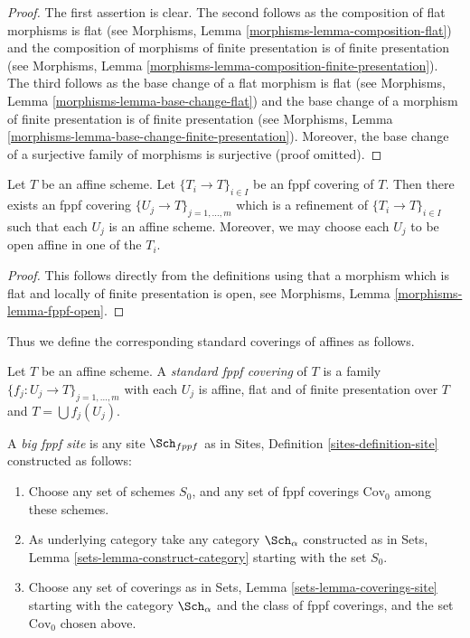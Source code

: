 \begin{proof}
The first assertion is clear.
The second follows as the composition of flat morphisms is flat
(see Morphisms, Lemma \ref{morphisms-lemma-composition-flat})
and the composition of morphisms of finite presentation is
of finite presentation
(see Morphisms, Lemma \ref{morphisms-lemma-composition-finite-presentation}).
The third follows as the base change of a flat morphism is flat
(see Morphisms, Lemma \ref{morphisms-lemma-base-change-flat})
and the base change of a morphism of finite presentation is
of finite presentation
(see Morphisms, Lemma \ref{morphisms-lemma-base-change-finite-presentation}).
Moreover, the base change of a surjective family of morphisms is surjective
(proof omitted).
\end{proof}

\begin{lemma}
\label{lemma-fppf-affine}
Let $T$ be an affine scheme.
Let $\{T_i \to T\}_{i \in I}$ be an fppf covering of $T$.
Then there exists an fppf covering
$\{U_j \to T\}_{j = 1, \ldots, m}$ which is a refinement
of $\{T_i \to T\}_{i \in I}$ such that each $U_j$ is an affine
scheme. Moreover, we may choose each $U_j$ to be open affine
in one of the $T_i$.
\end{lemma}

\begin{proof}
This follows directly from the definitions using that a
morphism which is flat and locally of finite presentation is open,
see Morphisms, Lemma \ref{morphisms-lemma-fppf-open}.
\end{proof}

\noindent
Thus we define the corresponding standard coverings of affines as follows.

\begin{definition}
\label{definition-standard-fppf}
Let $T$ be an affine scheme. A {\it standard fppf covering}
of $T$ is a family $\{f_j : U_j \to T\}_{j = 1, \ldots, m}$
with each $U_j$ is affine, flat and of finite presentation over $T$
and $T = \bigcup f_j(U_j)$.
\end{definition}

\begin{definition}
\label{definition-big-fppf-site}
A {\it big fppf site} is any site $\Sch_{fppf}$ as in
Sites, Definition \ref{sites-definition-site} constructed as follows:
\begin{enumerate}
\item Choose any set of schemes $S_0$, and any set of fppf coverings
$\text{Cov}_0$ among these schemes.
\item As underlying category take any category $\Sch_\alpha$
constructed as in Sets, Lemma \ref{sets-lemma-construct-category}
starting with the set $S_0$.
\item Choose any set of coverings as in
Sets, Lemma \ref{sets-lemma-coverings-site} starting with the
category $\Sch_\alpha$ and the class of fppf coverings,
and the set $\text{Cov}_0$ chosen above.
\end{enumerate}
\end{definition}

